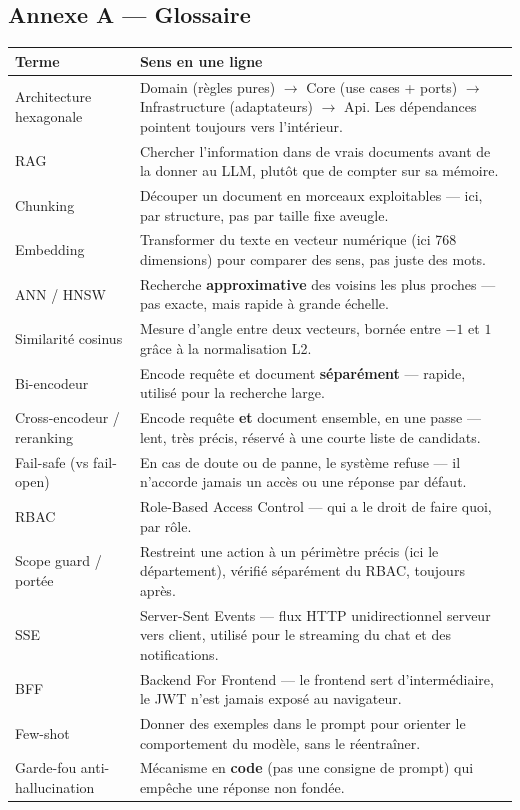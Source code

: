 \documentclass[12pt,a4paper]{article}
\begin{document}
\subsection*{Annexe A --- Glossaire}
\begin{center}\small
\begin{tabularx}{\textwidth}{@{}l X@{}}
\toprule
\textbf{Terme} & \textbf{Sens en une ligne} \\
\midrule
Architecture hexagonale & Domain (r\`egles pures) $\to$ Core (use cases + ports) $\to$ Infrastructure (adaptateurs) $\to$ Api. Les d\'ependances pointent toujours vers l'int\'erieur. \\
RAG & Chercher l'information dans de vrais documents avant de la donner au LLM, plut\^ot que de compter sur sa m\'emoire. \\
Chunking & D\'ecouper un document en morceaux exploitables --- ici, par structure, pas par taille fixe aveugle. \\
Embedding & Transformer du texte en vecteur num\'erique (ici 768 dimensions) pour comparer des sens, pas juste des mots. \\
ANN / HNSW & Recherche \textbf{approximative} des voisins les plus proches --- pas exacte, mais rapide \`a grande \'echelle. \\
Similarit\'e cosinus & Mesure d'angle entre deux vecteurs, born\'ee entre $-1$ et $1$ gr\^ace \`a la normalisation L2. \\
Bi-encodeur & Encode requ\^ete et document \textbf{s\'epar\'ement} --- rapide, utilis\'e pour la recherche large. \\
Cross-encodeur / reranking & Encode requ\^ete \textbf{et} document ensemble, en une passe --- lent, tr\`es pr\'ecis, r\'eserv\'e \`a une courte liste de candidats. \\
Fail-safe (vs fail-open) & En cas de doute ou de panne, le syst\`eme refuse --- il n'accorde jamais un acc\`es ou une r\'eponse par d\'efaut. \\
RBAC & Role-Based Access Control --- qui a le droit de faire quoi, par r\^ole. \\
Scope guard / port\'ee & Restreint une action \`a un p\'erim\`etre pr\'ecis (ici le d\'epartement), v\'erifi\'e s\'epar\'ement du RBAC, toujours apr\`es. \\
SSE & Server-Sent Events --- flux HTTP unidirectionnel serveur vers client, utilis\'e pour le streaming du chat et des notifications. \\
BFF & Backend For Frontend --- le frontend sert d'interm\'ediaire, le JWT n'est jamais expos\'e au navigateur. \\
Few-shot & Donner des exemples dans le prompt pour orienter le comportement du mod\`ele, sans le r\'eentra\^iner. \\
Garde-fou anti-hallucination & M\'ecanisme en \textbf{code} (pas une consigne de prompt) qui emp\^eche une r\'eponse non fond\'ee. \\
\bottomrule
\end{tabularx}
\end{center}
\end{document}
